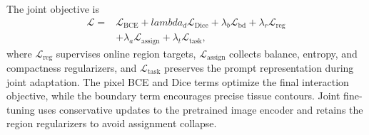 \documentclass[letterpaper]{article} %
\begin{document}
The joint objective is
\begin{equation}
\begin{split}
    \mathcal{L}={}&
    \mathcal{L}_{\mathrm{BCE}}+lambda_d\mathcal{L}_{\mathrm{Dice}}
    +\lambda_b\mathcal{L}_{\mathrm{bd}}
    +\lambda_r\mathcal{L}_{\mathrm{reg}} \\
    &+\lambda_a\mathcal{L}_{\mathrm{assign}}
    +\lambda_t\mathcal{L}_{\mathrm{task}},
\end{split}
\end{equation}
where $\mathcal{L}_{\mathrm{reg}}$ supervises online region targets, $\mathcal{L}_{\mathrm{assign}}$ collects balance, entropy, and compactness regularizers, and $\mathcal{L}_{\mathrm{task}}$ preserves the prompt representation during joint adaptation. The pixel BCE and Dice terms optimize the final interaction objective, while the boundary term encourages precise tissue contours. Joint fine-tuning uses conservative updates to the pretrained image encoder and retains the region regularizers to avoid assignment collapse.



% 
\end{document}
